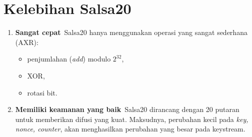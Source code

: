 \documentclass{article}
\begin{document}

\section*{Kelebihan Salsa20}

\begin{enumerate}
    \item \textbf{Sangat cepat}\
    Salsa20 hanya menggunakan operasi yang sangat sederhana (AXR):
    \begin{itemize}
        \item penjumlahan (\textit{add}) modulo $2^{32}$,
        \item XOR,
        \item rotasi bit.
    \end{itemize}

    \item \textbf{Memiliki keamanan yang baik}\
    Salsa20 dirancang dengan 20 putaran untuk memberikan difusi yang kuat. Maksudnya, perubahan kecil pada \textit{key, nonce, counter}, akan menghasilkan perubahan yang besar pada keystream.
\end{enumerate}
\end{document}
